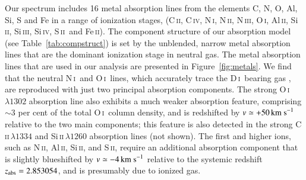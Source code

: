 \documentclass[12pt,preprint,useAMS,usenatbib]{emulateapj}
\newcommand{\AlII}{Al\,\textsc{ii}}
\newcommand{\CII}{C\,\textsc{ii}}
\newcommand{\CIV}{C\,\textsc{iv}}
\newcommand{\DI}{\textrm{D}\,\textsc{i}}
\newcommand{\FeII}{Fe\,\textsc{ii}}
\newcommand{\NI}{N\,\textsc{i}}
\newcommand{\NII}{N\,\textsc{ii}}
\newcommand{\NIII}{N\,\textsc{iii}}
\newcommand{\OI}{O\,\textsc{i}}
\newcommand{\SII}{S\,\textsc{ii}}
\newcommand{\SiII}{Si\,\textsc{ii}}
\newcommand{\SiIII}{Si\,\textsc{iii}}
\newcommand{\SiIV}{Si\,\textsc{iv}}
\begin{document}
Our spectrum includes 16 metal absorption lines from
the elements C, N, O, Al, Si, S and Fe in a range of
ionization stages, (\CII, \CIV, \NI, \NII, \NIII, \OI, \AlII, \SiII,
\SiIII, \SiIV, \SII\ and \FeII). The component structure of
our absorption model (see Table~\ref{tab:compstruct})
is set by the unblended, narrow metal absorption lines that
are the dominant ionization stage in neutral gas. The metal
absorption lines that are used in our analysis are presented in
Figure~\ref{fig:metals}. We find that the neutral \NI\
and \OI\ lines, which accurately trace the \DI\ bearing gas
\citep[][see also, \citealt{FieSte71,SteWerGel71}]{CooPet16},
are reproduced with just two principal absorption
components. The strong \OI\,$\lambda1302$ absorption line
also exhibits a much weaker absorption feature, comprising $\sim3$
per cent of the total \OI\ column density, and is redshifted
by $v\simeq+50\,{\rm km~s}^{-1}$ relative to the two main components;
this feature is also detected in the strong \CII\,$\lambda1334$ and
\SiII\,$\lambda1260$ absorption lines (not shown).
The first and higher ions, such as \NII, \AlII, \SiII, and \SII,
require an additional absorption component that is slightly blueshifted
by $v\simeq-4\,{\rm km~s}^{-1}$ relative to the systemic redshift
$z_{\rm abs}=2.853054$, and is presumably due to ionized gas.
\end{document}
